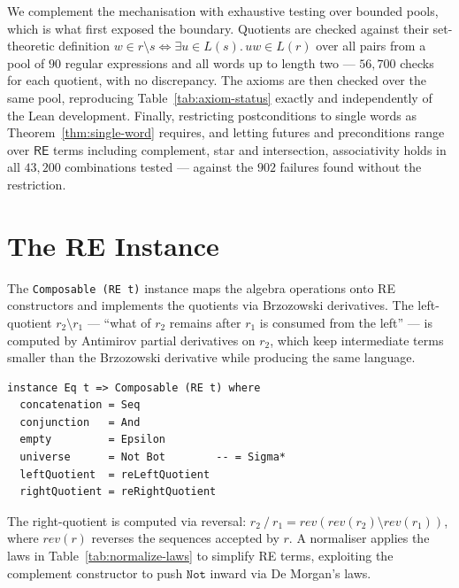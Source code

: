 \documentclass[acmsmall,screen]{acmart}
\newcommand{\RE}{\mathsf{RE}}
\newcommand{\lquot}{\mathbin{\setminus}}   %
\newcommand{\rquot}{\mathbin{/}}           %
\begin{document}
We complement the mechanisation with exhaustive testing over bounded pools,
which is what first exposed the boundary.
Quotients are checked against their set-theoretic definition
$w \in r \lquot s \iff \exists u \in L(s).\, uw \in L(r)$
over all pairs from a pool of $90$ regular expressions and all words up to
length two --- $56{,}700$ checks for each quotient, with no discrepancy.
The axioms are then checked over the same pool, reproducing
Table~\ref{tab:axiom-status} exactly and independently of the Lean
development.
Finally, restricting postconditions to single words as
Theorem~\ref{thm:single-word} requires, and letting futures and
preconditions range over $\RE$ terms including complement, star and
intersection, associativity holds in all $43{,}200$ combinations tested ---
against the $902$ failures found without the restriction.

\section{The RE Instance}
\label{sec:re-instance}

The \lstinline{Composable (RE t)} instance maps the algebra operations onto
RE constructors and implements the quotients via Brzozowski derivatives.
The left-quotient $r_2 \lquot r_1$ --- ``what of $r_2$ remains after $r_1$ is
consumed from the left'' --- is computed by Antimirov partial derivatives on
$r_2$, which keep intermediate terms smaller than the Brzozowski derivative
while producing the same language.

\begin{lstlisting}
instance Eq t => Composable (RE t) where
  concatenation = Seq
  conjunction   = And
  empty         = Epsilon
  universe      = Not Bot        -- = Sigma*
  leftQuotient  = reLeftQuotient
  rightQuotient = reRightQuotient
\end{lstlisting}

\noindent
The right-quotient is computed via reversal:
$r_2 \rquot r_1 = \mathit{rev}(\mathit{rev}(r_2) \lquot \mathit{rev}(r_1))$,
where $\mathit{rev}(r)$ reverses the sequences accepted by $r$.
A normaliser applies the laws in Table~\ref{tab:normalize-laws}
to simplify RE terms, exploiting the complement constructor to push
$\mathtt{Not}$ inward via De Morgan's laws.
\end{document}
